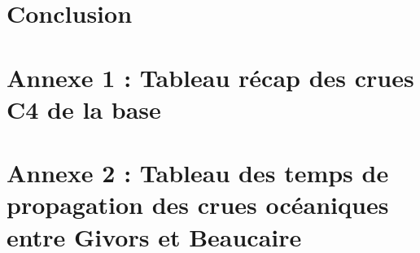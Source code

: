 \documentclass[11pt]{article}
\begin{document}
\section{Conclusion}

\section{Annexe 1 : Tableau récap des crues C4 de la base}

\section{Annexe 2 : Tableau des temps de propagation des crues océaniques entre Givors et Beaucaire}


\printbibliography
\end{document}
